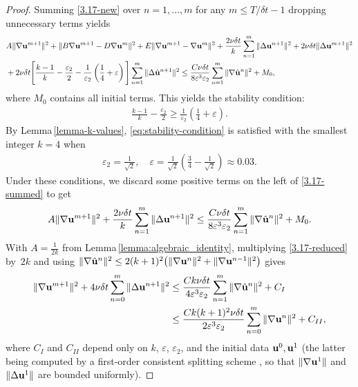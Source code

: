 \documentclass{article}
\theoremstyle{definition}                   %
\begin{document}
\begin{proof}
Summing \eqref{3.17-new} over $n=1,\dots,m$ for any $m\le T/\delta t-1$ dropping unnecessary terms yields
\begin{align}
&A\|\nabla {\bf u}^{m+1}\|^2
+ \|B\nabla {\bf u}^{m+1} - D\nabla {\bf u}^{m}\|^2
+ E\|\nabla {\bf u}^{m+1} - \nabla {\bf u}^{m}\|^2 + \frac{2\nu \delta t}{k}\sum_{n=1}^{m}\|\Delta {\bf u}^{n+1}\|^2
+ 2\nu \delta t \|\Delta {\bf u}^{m+1}\|^2 \notag \\
& + 2\nu \delta t
\Bigg[
\frac{k-1}{k} - \frac{\varepsilon_2}{2}
- \frac{1}{\varepsilon_2}
\left(\frac{1}{4}+\varepsilon\right)
\Bigg]
\sum_{n=1}^{m}\|\Delta\hat{\bf u}^{n+1}\|^2
\le  \frac{C\nu \delta t}{8\varepsilon^3 \varepsilon_2}
\sum_{n=1}^{m}\|\nabla \hat{\bf u}^n\|^2
+ M_0,
\label{3.17-summed}
\end{align}
where $M_0$ contains all initial terms. This yields the stability condition:
    \begin{align}
    \frac{k-1}{k} - \frac{\varepsilon_2}{2}
    \ge \frac{1}{\varepsilon_2} \left(\frac{1}{4}+\varepsilon\right).
    \label{eq:stability-condition}
    \end{align}
By Lemma\,\ref{lemma-k-values}, \eqref{eq:stability-condition} is satisfied
with the smallest integer $k=4$ when
\begin{align}
\varepsilon_2 =\frac{1}{\sqrt{2}}, \quad
\varepsilon   = \frac{1}{\sqrt{2}} \left( \frac{3}{4} - \frac{1}{\sqrt{2}}\right) \approx 0.03.
\label{def_epsandeps2}
\end{align}
%
Under these conditions, we discard some positive terms on the left of \eqref{3.17-summed} to get
\begin{align}
A\|\nabla {\bf u}^{m+1}\|^2
+ \frac{2\nu \delta t}{k}\sum_{n=1}^{m}\|\Delta {\bf u}^{n+1}\|^2
\le   \frac{C\nu \delta t}{ 8\varepsilon^3 \varepsilon_2}
\sum_{n=1}^{m}\|\nabla\hat{\bf u}^n \|^2
+ M_0.
\label{3.17-reduced}
\end{align}
With $A=\frac{1}{2k}$ from Lemma\,\ref{lemma:algebraic_identity}, multiplying
\eqref{3.17-reduced} by~$2k$ and using
$\|\nabla\hat{\bf u}^n\|^2\le 2(k+1)^2\bigl(\|\nabla{\bf u}^n\|^2+\|\nabla{\bf u}^{n-1}\|^2\bigr)$
gives
\begin{align}
\|\nabla{\bf u}^{m+1}\|^2 + 4\nu\delta t \sum_{n=0}^m
\|\Delta {\bf u}^{n+1}\|^2
&\le
\frac{Ck\nu \delta t}{4\varepsilon^3 \varepsilon_2 }
 \sum_{n=1}^m\|\nabla \hat{\bf u}^n\|^2 +C_I\notag\\
&\le
\frac{Ck(k+1)^2\nu \delta t}{2\varepsilon^3 \varepsilon_2 }
 \sum_{n=0}^m\|\nabla{\bf u}^n\|^2 +C_{II},
\label{3.17-after-new}
\end{align}
where $C_I$ and $C_{II}$ depend only on $k$, $\varepsilon$, $\varepsilon_2$,
and the initial data ${\bf u}^0,{\bf u}^1$ (the latter being computed by a
first-order consistent splitting scheme \cite{guermond2003new}, so that
$\|\nabla{\bf u}^1\|$ and $\|\Delta{\bf u}^1\|$ are bounded uniformly).


\end{proof}
\end{document}
